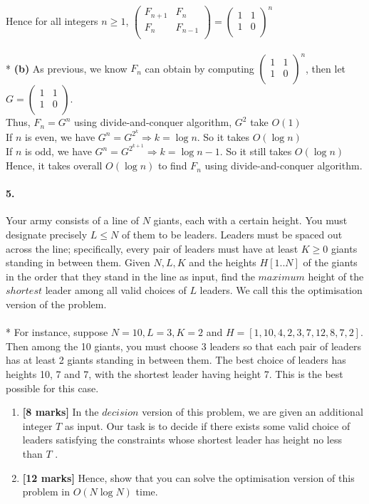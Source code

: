 \documentclass[a4paper]{scrartcl}
\begin{document}
Hence for all integers $n \geq 1$, 
$\begin{pmatrix}
  F_{n+1} & F_n \\
  F_n & F_{n-1} \\
 \end{pmatrix}
 =
 \begin{pmatrix}
   1 & 1 \\
   1 & 0 \\
 \end{pmatrix}^{\!n}$\\
 \\*
 {\bfseries(b)}
 As previous, we know $F_n$ can obtain by computing $\begin{pmatrix}
  1 & 1 \\
  1 & 0 \\
\end{pmatrix}^{\!n}$, then let $G=\begin{pmatrix}
  1 & 1 \\
  1 & 0 \\
\end{pmatrix}$.\\
Thus, $F_n=G^n$ using divide-and-conquer algorithm, $G^2$ take $O(1)$\\
If $n$ is even, we have $G^n=G^{2^k} \Rightarrow k = \log{n}$. So it takes $O(\log{n})$\\
If $n$ is odd, we have $G^n=G^{2^{k+1}} \Rightarrow k = \log{n} - 1$. So it still takes $O(\log{n})$
Hence, it takes overall $O(\log{n})$ to find $F_n$ using divide-and-conquer algorithm.
\paragraph{5.}
\label{sec:Question 5}
Your army consists of a line of $N$ giants, each with a certain height. You must designate precisely $L \leq N$ of them to be leaders. Leaders must be spaced out across the line; specifically, every pair of leaders must have at least $K \geq 0$ giants standing in between them. Given $N,L,K$ and the heights $H[1..N]$ of the giants in the order that they stand in the line as input, find the $maximum$ height of the $shortest$ leader among all valid choices of $L$ leaders. We call this the optimisation version of the problem.\\
\\*
For instance, suppose $N = 10,L = 3,K = 2$ and $H = [1,10,4,2,3,7,12,8,7,2].$ Then among the 10 giants, you must choose 3 leaders so that each pair of leaders has at least 2 giants standing in between them. The best choice of leaders has heights 10, 7 and 7, with the shortest leader having height 7. This is the best possible for this case.
\begin{enumerate}[label=(\alph*)]
  \item {\bfseries[8 marks]} In the $decision$ version of this problem, we are given an additional integer $T$ as input. Our task is to decide if there exists some valid choice of leaders satisfying the constraints whose shortest leader has height no less than $T$ .
  \item {\bfseries[12 marks]} Hence, show that you can solve the optimisation version of this problem in $O(N\log{N})$ time.
\end{enumerate}
\end{document}
